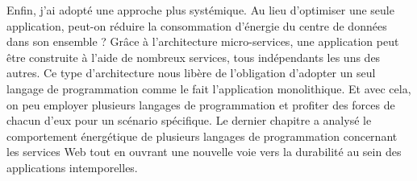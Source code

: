 \begin{abstract_fr}
Enfin, j'ai adopté une approche plus systémique.
Au lieu d'optimiser une seule application, peut-on réduire la consommation d'énergie du centre de données dans son ensemble ? Grâce à l'architecture micro-services, une application peut être construite à l'aide de nombreux services, tous indépendants les uns des autres.
Ce type d'architecture nous libère de l'obligation d'adopter un seul langage de programmation comme le fait l'application monolithique. 
Et avec cela, on peu employer plusieurs langages de programmation et profiter des forces de chacun d'eux pour un scénario spécifique. 
Le dernier chapitre a analysé le comportement énergétique de plusieurs langages de programmation concernant les services Web tout en ouvrant une nouvelle voie vers la durabilité au sein des applications intemporelles. 
\end{abstract_fr}
